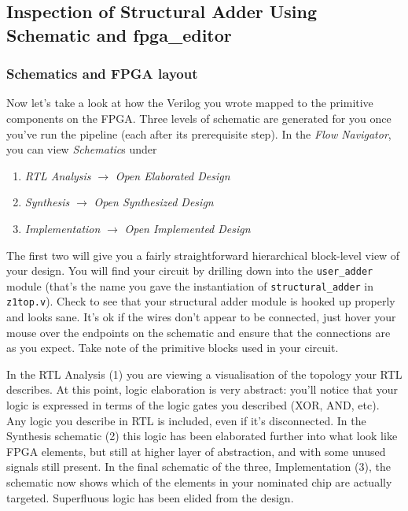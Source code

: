 \documentclass[11pt]{article}
\begin{document}
\subsection{Inspection of Structural Adder Using Schematic and fpga\_editor}
\subsubsection{Schematics and FPGA layout}
Now let's take a look at how the Verilog you wrote mapped to the primitive components on the FPGA. Three levels of schematic are generated for you once you've run the pipeline (each after its prerequisite step). In the \emph{Flow Navigator}, you can view \emph{Schematic}s under

\begin{enumerate}
  \item \emph{RTL Analysis} $\rightarrow$ \emph{Open Elaborated Design}
  \item \emph{Synthesis} $\rightarrow$ \emph{Open Synthesized Design}
  \item \emph{Implementation} $\rightarrow$ \emph{Open Implemented Design}
\end{enumerate}

The first two will give you a fairly straightforward hierarchical block-level view of your design. You will find your circuit by drilling down into the \verb|user_adder| module (that's the name you gave the instantiation of \verb|structural_adder| in \verb|z1top.v|). Check to see that your structural adder module is hooked up properly and looks sane. It's ok if the wires don't appear to be connected, just hover your mouse over the endpoints on the schematic and ensure that the connections are as you expect. Take note of the primitive blocks used in your circuit.

In the RTL Analysis (1) you are viewing a visualisation of the topology your RTL describes. At this point, logic elaboration is very abstract: you'll notice that your logic is expressed in terms of the logic gates you described (XOR, AND, etc). Any logic you describe in RTL is included, even if it's disconnected. In the Synthesis schematic (2) this logic has been elaborated further into what look like FPGA elements, but still at higher layer of abstraction, and with some unused signals still present. In the final schematic of the three, Implementation (3), the schematic now shows which of the elements in your nominated chip are actually targeted. Superfluous logic has been elided from the design.
\end{document}
